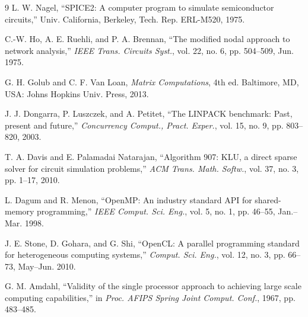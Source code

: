 \documentclass[conference]{IEEEtran}
\begin{document}
\begin{thebibliography}{9}
L. W. Nagel, ``SPICE2: A computer program to simulate semiconductor circuits,'' Univ. California, Berkeley, Tech. Rep. ERL-M520, 1975.

C.-W. Ho, A. E. Ruehli, and P. A. Brennan, ``The modified nodal approach to network analysis,'' \emph{IEEE Trans. Circuits Syst.}, vol. 22, no. 6, pp. 504--509, Jun. 1975.

G. H. Golub and C. F. Van Loan, \emph{Matrix Computations}, 4th ed. Baltimore, MD, USA: Johns Hopkins Univ. Press, 2013.

J. J. Dongarra, P. Luszczek, and A. Petitet, ``The LINPACK benchmark: Past, present and future,'' \emph{Concurrency Comput., Pract. Exper.}, vol. 15, no. 9, pp. 803--820, 2003.

T. A. Davis and E. Palamadai Natarajan, ``Algorithm 907: KLU, a direct sparse solver for circuit simulation problems,'' \emph{ACM Trans. Math. Softw.}, vol. 37, no. 3, pp. 1--17, 2010.

L. Dagum and R. Menon, ``OpenMP: An industry standard API for shared-memory programming,'' \emph{IEEE Comput. Sci. Eng.}, vol. 5, no. 1, pp. 46--55, Jan.--Mar. 1998.

J. E. Stone, D. Gohara, and G. Shi, ``OpenCL: A parallel programming standard for heterogeneous computing systems,'' \emph{Comput. Sci. Eng.}, vol. 12, no. 3, pp. 66--73, May--Jun. 2010.

G. M. Amdahl, ``Validity of the single processor approach to achieving large scale computing capabilities,'' in \emph{Proc. AFIPS Spring Joint Comput. Conf.}, 1967, pp. 483--485.
\end{thebibliography}
\end{document}
